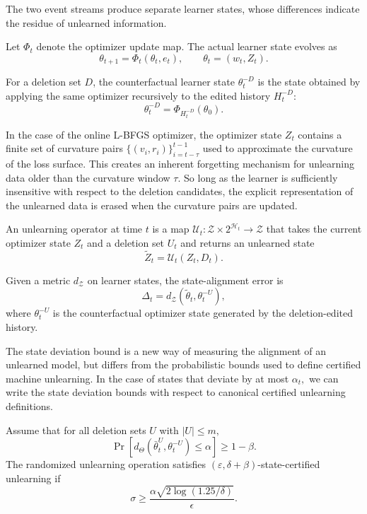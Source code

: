 \documentclass{ssl}
\begin{document}
The two event streams produce separate learner states, whose differences indicate the residue of unlearned information.

\begin{definition}
Let $\Phi_t$ denote the optimizer update map. The actual learner state evolves as
$$
    \theta_{t+1} = \Phi_t(\theta_t,e_t),
    \qquad \theta_t=(w_t,Z_t).
$$

For a deletion set $D$, the counterfactual learner state $\theta_t^{-D}$ is the
state obtained by applying the same optimizer recursively to the edited history
$H_t^{-D}$:
$$
    \theta_t^{-D} = \Phi_{H_t^{-D}}(\theta_0).
$$
\end{definition}

In the case of the online L-BFGS optimizer, the optimizer state $Z_t$ contains a finite set of curvature pairs $\{ (v_i, r_i) \}_{i=t-\tau}^{t-1}$ used to approximate the curvature of the loss surface. This creates an inherent forgetting mechanism for unlearning data older than the curvature window $\tau$. So long as the learner is sufficiently insensitive with respect to the deletion candidates, the explicit representation of the unlearned data is erased when the curvature pairs are updated.

\begin{definition}
An unlearning operator at time $t$ is a map $\mathcal U_t:\mathcal Z \times 2^{\mathcal H_t} \to \mathcal Z$
that takes the current optimizer state $Z_t$ and a deletion set $U_t$ and returns an unlearned state
$$
\widetilde Z_t = \mathcal U_t(Z_t,D_t).
$$
\end{definition}

\begin{definition}
\label{def:state-alignment-error}
Given a metric $d_{\mathcal Z}$ on learner states, the state-alignment error is
$$
\Delta_t = d_{\mathcal Z}(\widetilde \theta_t,\theta_t^{-U}),
$$
where $\theta_t^{-U}$ is the counterfactual optimizer state generated by the deletion-edited history.
\end{definition}

The state deviation bound is a new way of measuring the alignment of an unlearned model, but differs from the probabilistic bounds used to define certified machine unlearning. In the case of states that deviate by at most $\alpha_t,$ we can write the state deviation bounds with respect to canonical certified unlearning definitions.

\begin{definition}
\label{def: state-certified-unlearning}
Assume that for all deletion sets $U$ with $|U| \leq m,$
$$
    \Pr[d_{\Theta}(\bar \theta_{t}^{U}, \theta_{t}^{-U}) \leq \alpha] \geq 1 - \beta.
$$
The randomized unlearning operation satisfies $(\varepsilon, \delta + \beta)$-state-certified unlearning if 
$$
\sigma \geq \frac{
    \alpha \sqrt{2 \log{(1.25 / \delta)}}
}{
    \epsilon
}.
$$
\end{definition}
\end{document}
